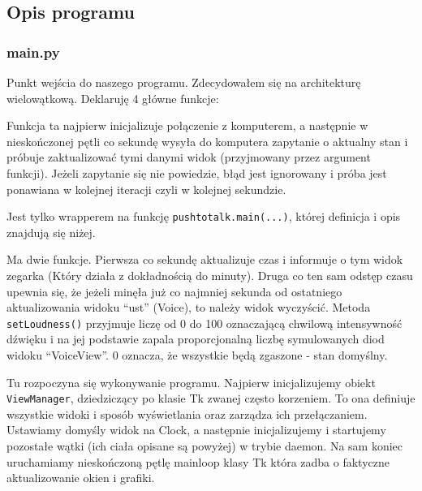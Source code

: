 \documentclass[declaration,shortabstract, inz]{iithesis}
\begin{document}
\subsection{Opis programu}
\subsubsection{main.py}
% 
    Punkt wejścia do naszego programu. Zdecydowałem się na architekturę wielowątkową. Deklaruję 4 główne funkcje:
    \begin{description}[style=nextline]
        \item[computer\textunderscore{}process]
            Funkcja ta najpierw inicjalizuje połączenie z komputerem, a następnie w nieskończonej pętli co sekundę wysyła do komputera zapytanie o aktualny stan i próbuje zaktualizować tymi danymi widok (przyjmowany przez argument funkcji). Jeżeli zapytanie się nie powiedzie, błąd jest ignorowany i próba jest ponawiana w kolejnej iteracji czyli w kolejnej sekundzie.
        \item[assistant\textunderscore{}process]
            Jest tylko wrapperem na funkcję \texttt{pushtotalk.main(...)}, której definicja i opis znajdują się niżej.
        \item[clock\textunderscore{}process]
            Ma dwie funkcje. Pierwsza co sekundę aktualizuje czas i informuje o tym widok zegarka (Który działa z dokładnością do minuty).
            Druga co ten sam odstęp czasu upewnia się, że jeżeli minęła już co najmniej sekunda od ostatniego aktualizowania widoku ``ust'' (Voice), to należy widok wyczyścić. Metoda \texttt{setLoudness()} przyjmuje liczę od 0 do 100 oznaczającą chwilową intensywność dźwięku i na jej podstawie zapala proporcjonalną liczbę symulowanych diod widoku ``VoiceView''. 0 oznacza, że wszystkie będą zgaszone - stan domyślny.
        \item[main]
            Tu rozpoczyna się wykonywanie programu. Najpierw inicjalizujemy obiekt \texttt{ViewManager}, dziedziczący po klasie Tk zwanej często korzeniem. To ona definiuje wszystkie widoki i sposób wyświetlania oraz zarządza ich przełączaniem.
            Ustawiamy domyśly widok na Clock, a następnie inicjalizujemy i startujemy pozostałe wątki (ich ciała opisane są powyżej) w trybie daemon. Na sam koniec uruchamiamy nieskończoną pętlę mainloop klasy Tk która zadba o faktyczne aktualizowanie okien i grafiki.
    \end{description}
    
\end{document}
